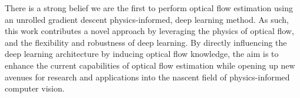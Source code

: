 
\IEEEPARstart{}{} There is a strong belief we are the first to perform optical flow estimation using an unrolled gradient descent physics-informed, deep learning method. As such, this work contributes a novel approach by leveraging the physics of optical flow, and the flexibility and robustness of deep learning. By directly influencing the deep learning architecture by inducing optical flow knowledge, the aim is to enhance the current capabilities of optical flow estimation while opening up new avenues for research and applications into the nascent field of physics-informed computer vision.
